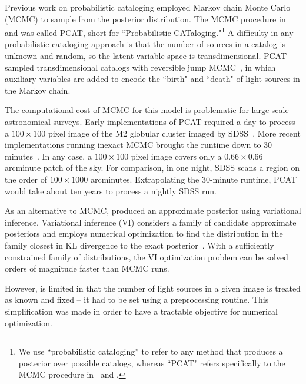 Previous work on probabilistic cataloging employed Markov chain Monte Carlo (MCMC) to sample from the posterior distribution.
The MCMC procedure in~\cite{Portillo_2017} and \cite{Feder_2019}
was called PCAT, short for ``Probabilistic CATaloging."\footnote{
We use ``probabilistic cataloging'' to refer to any method that produces a posterior over possible catalogs, whereas ``PCAT" refers specifically to the MCMC procedure in~\cite{Portillo_2017} and \cite{Feder_2019}. }
A difficulty in any probabilistic cataloging approach is that the number of sources in a catalog is unknown and random, so the latent variable space is transdimensional. PCAT sampled transdimensional catalogs with reversible jump MCMC~\citep{Green95reversiblejump}, in which
auxiliary variables are added to encode the ``birth" and ``death" of light sources in the Markov chain.

The computational cost of MCMC for this model is problematic for large-scale astronomical surveys. 
Early implementations of PCAT required a day to process a $100\times 100$ pixel image of the M2 globular cluster imaged by SDSS~\citep{Portillo_2017}. 
More recent implementations running inexact MCMC brought the runtime down to 30  minutes~\citep{Feder_2019}.  
In any case, a $100\times 100$ pixel image covers only a $0.66 \times 0.66$ arcminute patch of the sky.
For comparison, in one night, SDSS scans a region on the order of $100 \times 1000$ arcminutes. 
Extrapolating the 30-minute runtime, PCAT would take about ten years to process a nightly SDSS run. 

As an alternative to MCMC, \cite{regier2019_celeste} produced an approximate posterior using variational inference.
Variational inference (VI) considers a family of candidate approximate posteriors and employs numerical optimization to find the distribution in the family closest
in KL divergence to the exact posterior~\citep{Jordan_intro_vi, Wainwrite_graph_models_vi, Blei_2017_vi_review}. 
With a sufficiently constrained family of distributions, the VI optimization problem can be solved orders of magnitude faster than MCMC runs. 

However, \cite{regier2019_celeste} is limited in that the number of light sources in a given image is treated as known and fixed -- it had to be set using a preprocessing routine. 
This simplification was made in order to have a tractable objective for numerical optimization. 

\bigbreak


